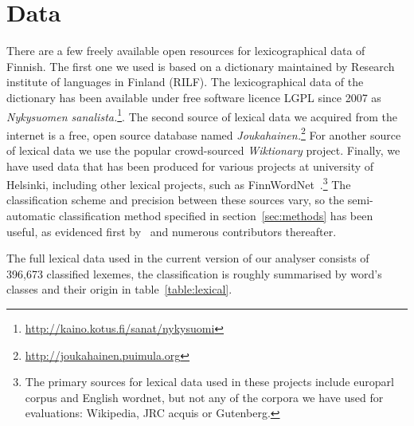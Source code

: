 \documentclass[a4paper,12pt]{article}
\begin{document}
\section{Data}
\label{sec:data}

There are a few freely available open resources for lexicographical data of
Finnish. The first one  we used is based on a dictionary maintained by Research
institute of languages in Finland (RILF). The lexicographical data of the
dictionary has been available under free software licence LGPL since 2007 as
\emph{Nykysuomen
sanalista.}\footnote{\url{http://kaino.kotus.fi/sanat/nykysuomi}}.  The second
source of lexical data we acquired from the internet is a free, open source
database named
\emph{Joukahainen.}\footnote{\url{http://joukahainen.puimula.org}}  For another
source of lexical data we use the popular crowd-sourced \emph{Wiktionary}
project.  Finally, we have used data that has been produced for various
projects at university of Helsinki, including other lexical projects, such as
FinnWordNet~\citep{linden2010finnwordnet}.\footnote{The primary sources for
lexical data used in these projects include europarl corpus and English
wordnet, but not any of the corpora we have used for evaluations: Wikipedia,
JRC acquis or Gutenberg.} The classification scheme and precision between
these sources vary, so the semi-automatic classification method specified in
section~\ref{sec:methods} has been useful, as evidenced first
by~\citet{listenmaa2009combining} and numerous contributors thereafter.

The full lexical data used in the current version of our analyser consists of
396,673 classified lexemes, the classification is roughly summarised by word's
classes and their origin in table~\ref{table:lexical}. 
\end{document}
